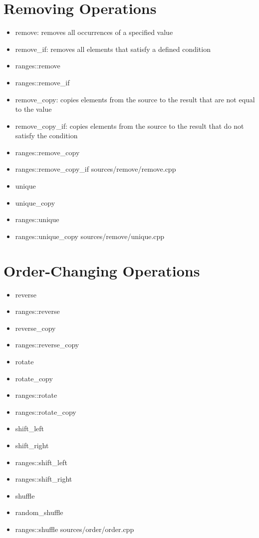 \documentclass{article}
\begin{document}
\section{Removing Operations}
    \begin{itemize}
      \item remove: removes all occurrences of a specified value
      \item remove\_if: removes all elements that satisfy a defined condition
      \item ranges::remove
      \item ranges::remove\_if
      \item remove\_copy: copies elements from the source to the result that are not equal to the value
      \item remove\_copy\_if: copies elements from the source to the result that do not satisfy the condition
      \item ranges::remove\_copy
      \item ranges::remove\_copy\_if
         {sources/remove/remove.cpp}
      \item unique
      \item unique\_copy
      \item ranges::unique
      \item ranges::unique\_copy
         {sources/remove/unique.cpp}
    \end{itemize}
\section{Order-Changing Operations}
    \begin{itemize}
      \item reverse
      \item ranges::reverse
      \item reverse\_copy
      \item ranges::reverse\_copy
      \item rotate
      \item rotate\_copy
      \item ranges::rotate
      \item ranges::rotate\_copy
      \item shift\_left
      \item shift\_right
      \item ranges::shift\_left
      \item ranges::shift\_right
      \item shuffle
      \item random\_shuffle
      \item ranges::shuffle
         {sources/order/order.cpp}
    \end{itemize}
\end{document}
